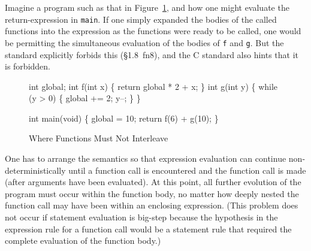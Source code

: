 \documentclass[11pt]{article}
\begin{document}
Imagine a program such as that in Figure~\ref{fig:two-functions}, and
how one might evaluate the return-expression in \texttt{main}.  If one
simply expanded the bodies of the called functions into the expression
as the functions were ready to be called, one would be permitting the
simultaneous evaluation of the bodies of \texttt{f} and \texttt{g}.
But the \cpp{} standard explicitly forbids this (\S1.8~fn8), and the C
standard also hints that it is forbidden.
\begin{figure}[htbp]
\begin{stdrule}
   int global;
   int f(int x) \{ return global * 2 + x; \}
   int g(int y) \{ while (y > 0) \{ global += 2; y--; \} \}

   int main(void) \{
     global = 10;
     return f(6) + g(10);
   \}
\end{stdrule}
\caption{Where Functions Must Not Interleave}
\label{fig:two-functions}
\end{figure}

One has to arrange the semantics so that expression evaluation can
continue non-deterministically until a function call is encountered
and the function call is made (after arguments have been evaluated).
At this point, all further evolution of the program must occur within
the function body, no matter how deeply nested the function call may
have been within an enclosing expression.  (This problem does not
occur if statement evaluation is big-step because the hypothesis in
the expression rule for a function call would be a statement rule that
required the complete evaluation of the function body.)
\end{document}
